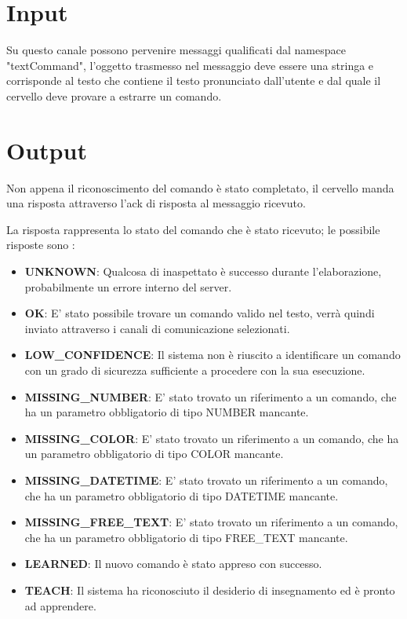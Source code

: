 \documentclass[twoside]{supsistudent}
\begin{document}
\section{Input}
Su questo canale possono pervenire messaggi qualificati dal namespace "textCommand", l'oggetto trasmesso nel messaggio deve essere una stringa e corrisponde al testo che contiene il testo pronunciato dall'utente e dal quale il cervello deve provare a estrarre un comando.
\section{Output}
Non appena il riconoscimento del comando è stato completato, il cervello manda una risposta attraverso l'ack di risposta al messaggio ricevuto.

La risposta rappresenta lo stato del comando che è stato ricevuto; le possibile risposte sono :

\begin{itemize}
	\item \textbf{UNKNOWN}: Qualcosa di inaspettato è successo durante l'elaborazione, probabilmente un errore interno del server.
	\item \textbf{OK}: E' stato possibile trovare un comando valido nel testo, verrà quindi inviato attraverso i canali di comunicazione selezionati.
	\item \textbf{LOW\_CONFIDENCE}: Il sistema non è riuscito a identificare un comando con un grado di sicurezza sufficiente a procedere con la sua esecuzione.
	\item \textbf{MISSING\_NUMBER}: E' stato trovato un riferimento a un comando, che ha un parametro obbligatorio di tipo NUMBER mancante.
	\item \textbf{MISSING\_COLOR}: E' stato trovato un riferimento a un comando, che ha un parametro obbligatorio di tipo COLOR mancante.
	\item \textbf{MISSING\_DATETIME}: E' stato trovato un riferimento a un comando, che ha un parametro obbligatorio di tipo DATETIME mancante.
	\item \textbf{MISSING\_FREE\_TEXT}: E' stato trovato un riferimento a un comando, che ha un parametro obbligatorio di tipo FREE\_TEXT mancante.
	\item \textbf{LEARNED}: Il nuovo comando è stato appreso con successo.
	\item \textbf{TEACH}: Il sistema ha riconosciuto il desiderio di insegnamento ed è pronto ad apprendere.
\end{itemize}
\end{document}
